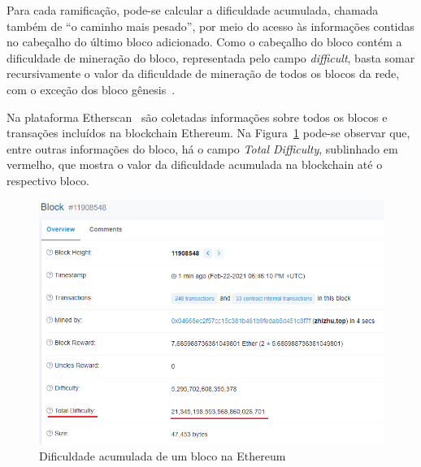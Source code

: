 Para cada ramificação, pode-se calcular a dificuldade acumulada, chamada também de ``o caminho mais pesado'', por meio do acesso às informações contidas no cabeçalho do último bloco adicionado. Como o cabeçalho do bloco contém a dificuldade de mineração do bloco, representada pelo campo \textit{difficult}, basta somar recursivamente o valor da dificuldade de mineração de todos os blocos da rede, com o exceção dos bloco gênesis~\cite{wood2014ethereum-yellow-paper}.

Na plataforma Etherscan~\cite{etherscan2020contracts} são coletadas informações sobre todos os blocos e transações incluídos na blockchain Ethereum. Na Figura~\ref{fig:eth-block-difficulty} pode-se observar que, entre outras informações do bloco, há o campo \textit{Total Difficulty}, sublinhado em vermelho, que mostra o valor da dificuldade acumulada na blockchain até o respectivo bloco.

\begin{figure}[htb]
 \caption{Dificuldade acumulada de um bloco na Ethereum}
 \label{fig:eth-block-difficulty}
 \centering
 \includegraphics[scale=0.6]{figuras/block-eth-difficulty.png}
\end{figure}





